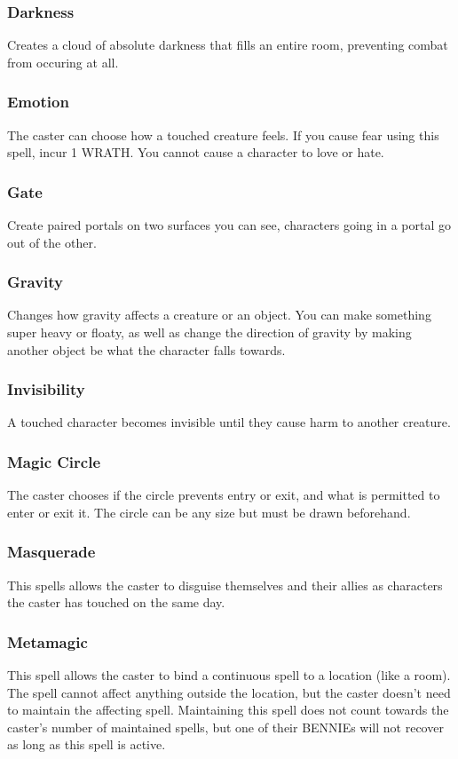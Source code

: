 \begin{multicols}{3}
\subsubsection*{Darkness}
Creates a cloud of absolute darkness that fills an entire room, preventing combat from occuring at all.
\subsubsection*{Emotion}
The caster can choose how a touched creature feels. If you cause fear using this spell, incur 1 WRATH. You cannot cause a character to love or hate.
\subsubsection*{Gate}
Create paired portals on two surfaces you can see, characters going in a portal go out of the other.
\subsubsection*{Gravity}
Changes how gravity affects a creature or an object. You can make something super heavy or floaty, as well as change the direction of gravity by making another object be what the character falls towards.
\subsubsection*{Invisibility}
A touched character becomes invisible until they cause harm to another creature.
\subsubsection*{Magic Circle}
The caster chooses if the circle prevents entry or exit, and what is permitted to enter or exit it. The circle can be any size but must be drawn beforehand.
\subsubsection*{Masquerade}
This spells allows the caster to disguise themselves and their allies as characters the caster has touched on the same day.
\subsubsection*{Metamagic}
This spell allows the caster to bind a continuous spell to a location (like a room). The spell cannot affect anything outside the location, but the caster doesn't need to maintain the affecting spell. Maintaining this spell does not count towards the caster's number of maintained spells, but one of their BENNIEs will not recover as long as this spell is active.

\end{multicols}
